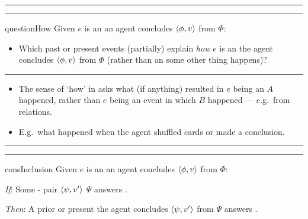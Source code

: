 \documentclass[10pt]{article}
\newcommand{\squareBullet}{\textcolor{black}{\raisebox{.45ex}{\rule{.6ex}{.6ex}}}}
\newcommand\lLine{{\color{gray} \noindent\rule{\textwidth}{0.4pt}}}
\newcommand\sepLine{
  \vfill
  \par\noindent\rule{\textwidth}{0.4pt}%
  \vspace{-10pt}%
  \par\noindent\rule{\textwidth}{0.4pt}
  \vfill}
\begin{document}
\sepLine

\begin{note}
  \begin{question}{questionHow}{\qHow{}}
    Given \(e\) is an  an agent concludes \(\langle\phi, v\rangle\) from \(\Phi\):
    \begin{itemize}[label = \squareBullet]
    \item
      Which past or present events (partially) explain \emph{how} \(e\) is an  the agent concludes \(\langle\phi, v\rangle\) from \(\Phi\) (rather than an  some other thing happens)?
    \end{itemize}
    \vspace{-1.5\baselineskip}
  \end{question}
\end{note}

\lLine

\begin{note}
  \begin{itemize}[noitemsep]
  \item
    The sense of `how' in \qHow{} asks what (if anything) resulted in \(e\) being an \eiw{} \(A\) happened, rather than \(e\) being an event in which \(B\) happened  --- e.g.\ from relations.
  \item
    E.g.\ what happened when the agent shuffled cards or made a conclusion.
  \end{itemize}
\end{note}

\sepLine

\begin{note}
  \begin{constraintD}{consInclusion}{\issueInclusion{}}
    Given \(e\) is an  an agent concludes \(\langle\phi, v\rangle\) from \(\Phi\):
    \begin{itenum}
    \item[\emph{If}:]
      Some - pair \(\langle\psi, v'\rangle\) \fingf{} \(\Psi\) answers \qWhy{}.
    \item[\emph{Then}:]
      A prior or present  the agent concludes \(\langle\psi, v'\rangle\) from \(\Psi\) answers \qHow{}.
    \end{itenum}
    \vspace{-1.25\baselineskip}
  \end{constraintD}
\end{note}

\begin{comment}
  This is where some important work is done.
  The thing is, this is set up in a careful way.
  \fofr{3} answer both \qWhy{} and \qHow{}.
  So, it's possible for a \fofr{} between a \prop{0}-\val{0} pair and \pool{} distinct from the \prop{0}-\val{0}-\pool{0} pair directly related to the conclusion to answer both \qWhy{} and \qHow{}.

  Key observation is that if the agent has not concluded \(\pv{\psi}{v'}\) from \(\Psi\) then \(\pv{\psi}{v'}\) \fof{} \(\Psi\) does not answer \qHow{}.
\end{comment}
\end{document}
